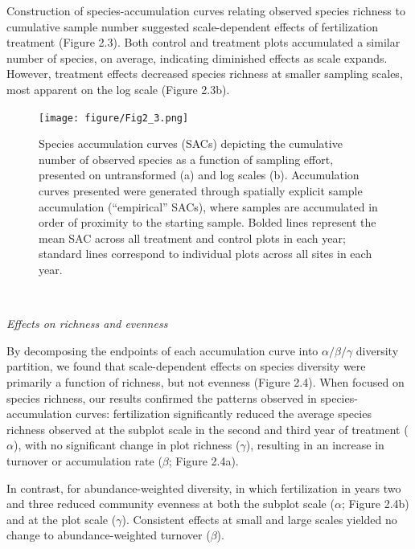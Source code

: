 \documentclass[twoside,12pt,final]{ucthesis-CA2012}
\begin{document}
\begin{ucmainmatter}
Construction of species-accumulation curves relating observed species richness to cumulative sample number suggested scale-dependent effects of fertilization treatment (Figure 2.3). Both control and treatment plots accumulated a similar number of species, on average, indicating diminished effects as scale expands. However, treatment effects decreased species richness at smaller sampling scales, most apparent on the log scale (Figure 2.3b).
\begin{figure}
\centering
\texttt{[image: figure/Fig2\_3.png]}
\caption{Species accumulation curves (SACs) depicting the cumulative number of observed species as a function of sampling effort, presented on untransformed (a) and log scales (b). Accumulation curves presented were generated through spatially explicit sample accumulation (``empirical'' SACs), where samples are accumulated in order of proximity to the starting sample. Bolded lines represent the mean SAC across all treatment and control plots in each year; standard lines correspond to individual plots across all sites in each year. \label{fig-2-3}}
\end{figure}
~

\emph{Effects on richness and evenness}

By decomposing the endpoints of each accumulation curve into \(\alpha / \beta / \gamma\) diversity partition, we found that scale-dependent effects on species diversity were primarily a function of richness, but not evenness (Figure 2.4). When focused on species richness, our results confirmed the patterns observed in species-accumulation curves: fertilization significantly reduced the average species richness observed at the subplot scale in the second and third year of treatment (\(\alpha\)), with no significant change in plot richness (\(\gamma\)), resulting in an increase in turnover or accumulation rate (\(\beta\); Figure 2.4a).

In contrast, for abundance-weighted diversity, in which fertilization in years two and three reduced community evenness at both the subplot scale (\(\alpha\); Figure 2.4b) and at the plot scale (\(\gamma\)). Consistent effects at small and large scales yielded no change to abundance-weighted turnover (\(\beta\)).


\end{ucmainmatter}
\end{document}
